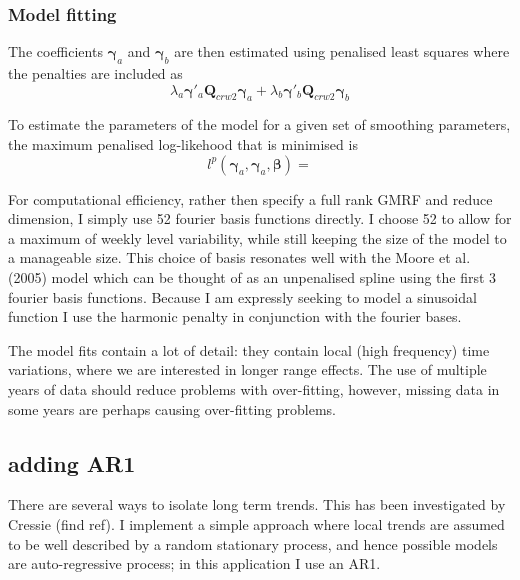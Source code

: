 \subsubsection{Model fitting}

The coefficients $\bm{\gamma}_a$ and $\bm{\gamma}_b$ are then estimated using penalised least squares where the penalties are included as 
\begin{equation}
  \lambda_a \bm{\gamma}'_a \bm{Q}_{crw2} \bm{\gamma}_a + \lambda_b \bm{\gamma}'_b \bm{Q}_{crw2} \bm{\gamma}_b
\end{equation}

To estimate the parameters of the model for a given set of smoothing parameters, the maximum penalised log-likehood that is minimised is
\begin{equation}
  l^p(\bm{\gamma}_a, \bm{\gamma}_a, \bm{\beta}) = 
\end{equation}

For computational efficiency, rather then specify a full rank GMRF and reduce dimension, I simply use 52 fourier basis functions directly.  I choose 52 to allow for a maximum of weekly level variability, while still keeping the size of the model to a manageable size.  This choice of basis resonates well with the Moore et al. (2005) model which can be thought of as an unpenalised spline using the first 3 fourier basis functions. Because I am expressly seeking to model a sinusoidal function I use the harmonic penalty in conjunction with the fourier bases. 

The model fits contain a lot of detail: they contain local (high frequency) time variations, where we are interested in longer range effects.  The use of multiple years of data should reduce problems with over-fitting, however, missing data in some years are perhaps causing over-fitting problems.





\subsection{adding AR1}

There are several ways to isolate long term trends.  This has been investigated by Cressie (find ref).  I implement a simple approach where local trends are assumed to be well described by a random stationary process, and hence possible models are auto-regressive process; in this application I use an AR1.  

